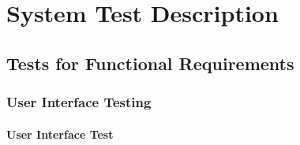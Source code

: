 \documentclass[12pt, titlepage]{article}
\begin{document}
\section{System Test Description}
	
\subsection{Tests for Functional Requirements}

\subsubsection{User Interface Testing}
		
\paragraph{User Interface Test}
\end{document}
